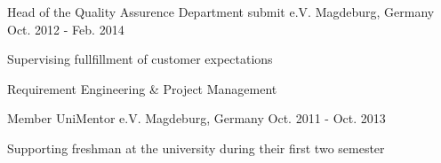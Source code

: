 

\begin{cventries}

  \cventry
    {Head of the Quality Assurence Department} %
    {submit e.V.} %
    {Magdeburg, Germany} %
    {Oct. 2012 - Feb. 2014} %
    {
      \begin{cvitems} %
        \item {Supervising fullfillment of customer expectations}
        \item {Requirement Engineering \& Project Management}
      \end{cvitems}
    }

  \cventry
    {Member} %
    {UniMentor e.V.} %
    {Magdeburg, Germany} %
    {Oct. 2011 - Oct. 2013} %
    {
      \begin{cvitems} %
        \item {Supporting freshman at the university during their first two semester}
      \end{cvitems}
    }

\end{cventries}
